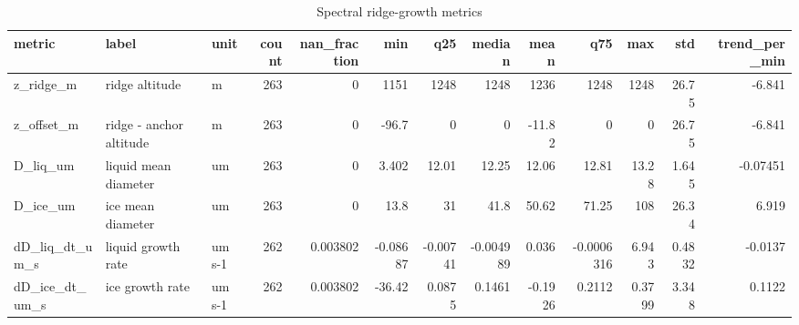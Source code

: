 \begin{table}[htbp]
\centering
\small
\caption{Spectral ridge-growth metrics}
\label{tab:growth_bundle_metrics}
\begin{tabular}{lllrrrrrrrrrr}
\toprule
metric & label & unit & count & nan\_fraction & min & q25 & median & mean & q75 & max & std & trend\_per\_min \\
\midrule
z\_ridge\_m & ridge altitude & m & 263 & 0 & 1151 & 1248 & 1248 & 1236 & 1248 & 1248 & 26.75 & -6.841 \\
z\_offset\_m & ridge - anchor altitude & m & 263 & 0 & -96.7 & 0 & 0 & -11.82 & 0 & 0 & 26.75 & -6.841 \\
D\_liq\_um & liquid mean diameter & um & 263 & 0 & 3.402 & 12.01 & 12.25 & 12.06 & 12.81 & 13.28 & 1.645 & -0.07451 \\
D\_ice\_um & ice mean diameter & um & 263 & 0 & 13.8 & 31 & 41.8 & 50.62 & 71.25 & 108 & 26.34 & 6.919 \\
dD\_liq\_dt\_um\_s & liquid growth rate & um s-1 & 262 & 0.003802 & -0.08687 & -0.00741 & -0.004989 & 0.036 & -0.0006316 & 6.943 & 0.4832 & -0.0137 \\
dD\_ice\_dt\_um\_s & ice growth rate & um s-1 & 262 & 0.003802 & -36.42 & 0.0875 & 0.1461 & -0.1926 & 0.2112 & 0.3799 & 3.348 & 0.1122 \\
\bottomrule
\end{tabular}

\end{table}
